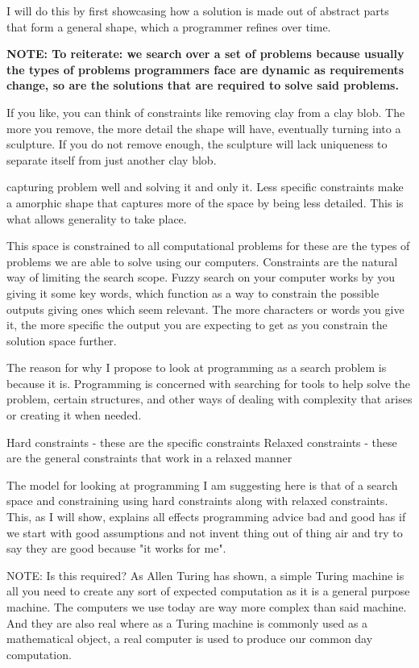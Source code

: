 \documentclass[a4paper]{article}
\begin{document}
I will do this by first showcasing how a solution is made out of abstract parts that form 
a general shape, which a programmer refines over time.

\textbf{NOTE: To reiterate: we search over a set of problems because usually the types of problems programmers face are dynamic as requirements change, so are the solutions that are required to solve said problems.}

If you like, you can think of constraints like removing clay from a clay blob. The more 
you remove, the more detail the shape will have, eventually turning into a sculpture. If 
you do not remove enough, the sculpture will lack uniqueness to separate itself from just 
another clay blob.

capturing problem well and solving it and only it. Less specific 
constraints make a amorphic shape that captures more of the space by being less detailed.
This is what allows generality to take place.

This space is constrained to all computational problems for these are the types of problems we 
are able to solve using our computers. Constraints are the natural way of limiting the search 
scope. Fuzzy search on your computer works by you giving it some key words, which function as
a way to constrain the possible outputs giving ones which seem relevant. The more characters
or words you give it, the more specific the output you are expecting to get as you constrain
the solution space further.

The reason for why I propose to look at programming as a search problem is because it is. 
Programming is concerned with searching for tools to help solve the problem, certain 
structures, and other ways of dealing with complexity that arises or creating it when needed. 

Hard constraints - these are the specific constraints
Relaxed constraints - these are the general constraints that work in a relaxed manner

The model for looking at programming I am suggesting here is that of a search space and constraining using hard constraints along with relaxed constraints. This, as I will show, explains all effects programming advice bad and good has if we start with good assumptions and not invent thing out of thing air and try to say they are good because "it works for me". 

NOTE: Is this required? 
As Allen Turing has shown, a simple Turing machine is all you need to create any sort of expected computation as it is a general purpose machine. The computers we use today are way more complex than said machine. And they are also real where as a Turing machine is commonly used as a mathematical object, a real computer is used to produce our common day computation.
\end{document}

